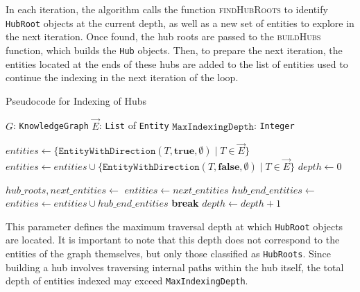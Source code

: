 In each iteration, the algorithm calls the function \textsc{findHubRoots} to identify \texttt{HubRoot} objects at the current depth, as well as a new set of entities to explore in the next iteration. Once found, the hub roots are passed to the \textsc{buildHubs} function, which builds the \texttt{Hub} objects. Then, to prepare the next iteration, the entities located at the ends of these hubs are added to the list of entities used to continue the indexing in the next iteration of the loop.

\begin{algorithm}[t]
\caption{Pseudocode for Indexing of Hubs}
\label{alg:indexing_hubs}
\begin{algorithmic}[1]
\PersistentState
    \Statex $G$: \texttt{KnowledgeGraph} 
\Require 
    \Statex $\vec{E}$: \texttt{List} of \texttt{Entity} 
    \Statex $\texttt{MaxIndexingDepth}$: \texttt{Integer} 

    \State $entities \gets \{ \texttt{EntityWithDirection}(T, \textbf{true}, \emptyset) \mid T \in \vec{E} \}$
    \State $entities \gets entities \cup \{ \texttt{EntityWithDirection}(T, \textbf{false}, \emptyset) \mid T \in \vec{E} \}$
        \State \Return
    \EndIf
    \State $depth \gets 0$ 
    
        \State $hub\_roots, next\_entities \gets$ 
        \State $entities \gets next\_entities$
        \State $hub\_end\_entities \gets$ 
        \State $entities \gets entities \cup hub\_end\_entities$
            \State \textbf{break} 
        \EndIf
        \State $depth \gets depth + 1$
    \EndWhile
\EndProcedure
\end{algorithmic}
\end{algorithm}

\begin{tcolorbox}[title=Parameter: \texttt{MaxIndexingDepth}]
This parameter defines the maximum traversal depth at which \texttt{HubRoot} objects are located. It is important to note that this depth does not correspond to the entities of the graph themselves, but only those classified as \texttt{HubRoots}. Since building a hub involves traversing internal paths within the hub itself, the total depth of entities indexed may exceed \texttt{MaxIndexingDepth}.
\end{tcolorbox}




